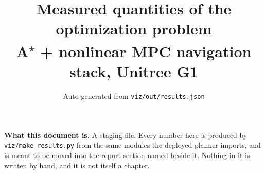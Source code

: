 \documentclass[11pt,a4paper]{article}
\title{Measured quantities of the optimization problem\\[2pt]
       \large A\textsuperscript{$\star$} + nonlinear MPC navigation stack, Unitree G1}
\author{Auto-generated from \texttt{viz/out/results.json}}
\date{\resDate}
\begin{document}
\maketitle
\thispagestyle{empty}

\noindent\textbf{What this document is.} A staging file. Every number here is
produced by \texttt{viz/make\_results.py} from the same modules the deployed
planner imports, and is meant to be moved into the report section named beside
it. Nothing in it is written by hand, and it is not itself a chapter.

\tableofcontents


\end{document}
